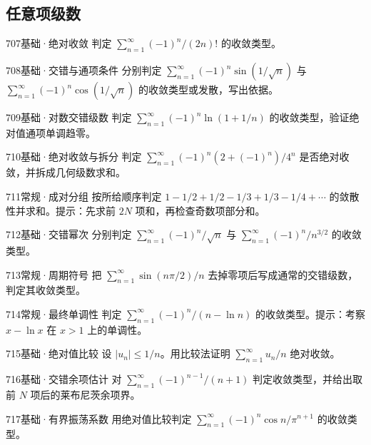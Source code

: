\subsection{任意项级数}
\begin{exercise}{707}{基础·绝对收敛}
判定 $\sum_{n=1}^{\infty}(-1)^n/(2n)!$ 的收敛类型。
\end{exercise}
\begin{exercise}{708}{基础·交错与通项条件}
分别判定 $\sum_{n=1}^{\infty}(-1)^n\sin(1/\sqrt n)$ 与 $\sum_{n=1}^{\infty}(-1)^n\cos(1/\sqrt n)$ 的收敛类型或发散，写出依据。
\end{exercise}
\begin{exercise}{709}{基础·对数交错级数}
判定 $\sum_{n=1}^{\infty}(-1)^n\ln(1+1/n)$ 的收敛类型，验证绝对值通项单调趋零。
\end{exercise}
\begin{exercise}{710}{基础·绝对收敛与拆分}
判定 $\sum_{n=1}^{\infty}(-1)^n(2+(-1)^n)/4^n$ 是否绝对收敛，并拆成几何级数求和。
\end{exercise}
\begin{exercise}{711}{常规·成对分组}
按所给顺序判定 $1-1/2+1/2-1/3+1/3-1/4+\cdots$ 的敛散性并求和。提示：先求前 $2N$ 项和，再检查奇数项部分和。
\end{exercise}
\begin{exercise}{712}{基础·交错幂次}
分别判定 $\sum_{n=1}^{\infty}(-1)^n/\sqrt n$ 与 $\sum_{n=1}^{\infty}(-1)^n/n^{3/2}$ 的收敛类型。
\end{exercise}
\begin{exercise}{713}{常规·周期符号}
把 $\sum_{n=1}^{\infty}\sin(n\pi/2)/n$ 去掉零项后写成通常的交错级数，判定其收敛类型。
\end{exercise}
\begin{exercise}{714}{常规·最终单调性}
判定 $\sum_{n=1}^{\infty}(-1)^n/(n-\ln n)$ 的收敛类型。提示：考察 $x-\ln x$ 在 $x>1$ 上的单调性。
\end{exercise}
\begin{exercise}{715}{基础·绝对值比较}
设 $|u_n|\leq1/n$。用比较法证明 $\sum_{n=1}^{\infty}u_n/n$ 绝对收敛。
\end{exercise}
\begin{exercise}{716}{基础·交错余项估计}
对 $\sum_{n=1}^{\infty}(-1)^{n-1}/(n+1)$ 判定收敛类型，并给出取前 $N$ 项后的莱布尼茨余项界。
\end{exercise}
\begin{exercise}{717}{基础·有界振荡系数}
用绝对值比较判定 $\sum_{n=1}^{\infty}(-1)^n\cos n/\pi^{n+1}$ 的收敛类型。
\end{exercise}
